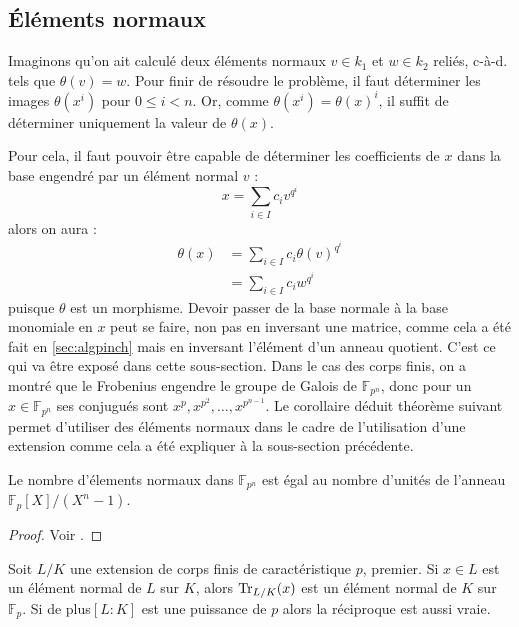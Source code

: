\documentclass[a4paper]{article} %
\numberwithin{section}{part}
\numberwithin{equation}{section}
\newcommand\GF[1]{\mathbb{F}_{#1}}
\begin{document}
\subsection{Éléments normaux}
\label{sec:elemnorm}
Imaginons qu'on ait calculé deux éléments normaux $v\in k_1$ 
et $w\in k_2$ reliés, c-à-d. tels que $\theta(v) = w$. Pour finir de résoudre le
problème, il faut déterminer les images $\theta(x^i)$ pour $0\leq i < n$. Or, 
comme $\theta(x^i) = \theta(x)^i$, il suffit de déterminer uniquement la valeur 
de $\theta(x)$.\par
Pour cela, il faut pouvoir être capable de déterminer les coefficients de $x$
dans la base engendré par un élément normal $v$ :
\begin{equation}
\label{eq:elemnorm1}
x = \sum_{i\in I}{c_iv^{q^i}}
\end{equation}
alors on aura :
\begin{align}
\theta(x) &= \sum_{i\in I}{c_i\theta(v)^{q^i}}\label{eq:elemnorm2}\\
&= \sum_{i\in I}{c_iw^{q^i}}\label{eq:elemnorm3}
\end{align}
puisque $\theta$ est un morphisme. Devoir passer de la base normale à la base 
monomiale en $x$ peut se faire, non pas en inversant une matrice, comme cela a
été fait en \ref{sec:algpinch} mais en inversant l'élément d'un anneau quotient.
C'est ce qui va être exposé dans cette sous-section. 
Dans le cas des corps finis, on a montré que le Frobenius engendre le groupe de 
Galois de $\GF{p^n}$, donc pour un $x\in\GF{p^n}$ ses conjugués sont 
$x^p, x^{p^2},\dots,x^{p^{n-1}}$. 
Le corollaire déduit théorème suivant permet d'utiliser des éléments normaux 
dans le cadre de l'utilisation d'une extension comme cela a été expliquer à la
sous-section précédente.
\begin{thm}
\label{th:nbelemnorm}
Le nombre d'élements normaux dans $\GF{p^n}$ est égal au nombre d'unités de
l'anneau $\GF{p}[X]/(X^n - 1)$.\par
\end{thm}
\begin{proof}
Voir \cite[th. 3.73]{LiNi2}.
\end{proof}
\begin{cor}
\label{cor:tracenorm}
Soit $L/K$ une extension de corps finis de caractéristique $p$, premier. Si
$x\in L$ est un élément normal de $L$ sur $K$, alors $\textup{Tr}_{L/K}(x)$ est 
un élément normal de $K$ sur $\GF{p}$. Si de plus$[L:K]$ est une puissance de 
$p$ alors la réciproque est aussi vraie.
\end{cor}
\end{document}
